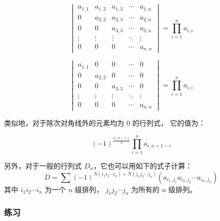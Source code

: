\documentclass[UTF8]{article}
\begin{document}

	\begin{equation*}
		\begin{vmatrix}
			a_{1, 1} & a_{1, 2} & a_{1, 3} & \cdots & a_{1, n}
			\\
			0 & a_{2, 2} & a_{2, 3} & \cdots & a_{2, n}
			\\
			0 & 0 & a_{3, 3} & \cdots & a_{3, n}
			\\
			\vdots & \vdots & \vdots & \ddots & \vdots
			\\
			0 & 0 & 0 & \cdots & a_{n, n}
		\end{vmatrix}
		=
		\prod_{i = 1}^{n} a_{i, i}
	\end{equation*}


	\begin{equation*}
		\begin{vmatrix}
			a_{1, 1} & 0 & 0 & \cdots & 0
			\\
			0 & a_{2, 2} & 0 & \cdots & 0
			\\
			0 & 0 & a_{3, 3} & \cdots & 0
			\\
			\vdots & \vdots & \vdots & \ddots & \vdots
			\\
			0 & 0 & 0 & \cdots & a_{n, n}
		\end{vmatrix}
		=
		\prod_{i = 1}^{n} a_{i, i}
	\end{equation*}

	\bigskip

	类似地，对于除次对角线外的元素均为 $0$ 的行列式，
	它的值为：

	$$
	(-1)^{\frac {n(n - 1)} {2}} \prod_{i = 1}^{n} a_{i, n + 1 - i}
	$$

	\bigskip

	另外，对于一般的行列式 $D_n$，它也可以用如下的式子计算：
	\begin{equation*}
		D = \sum (-1)^{N(i_1 i_2 \cdots i_n) + N(j_1 j_2 \cdots j_n)}
		(a_{i_1, j_1} a_{i_2, j_2} \cdots a_{i_n, j_n})
	\end{equation*}
	其中 $i_1 i_2 \cdots i_n$ 为一个 $n$ 级排列，
	$j_1 j_2 \cdots j_n$ 为所有的 $n$ 级排列。

	\subsubsection{练习}

\end{document}
